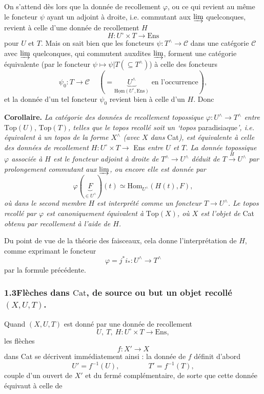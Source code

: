 \documentclass[11pt]{article}
\newcommand{\printedpage}[1]{\marginpar{\footnotesize p.~#1}}
\newcommand{\msp}[1]{\marginpar{\footnotesize [#1]}}
\newcommand{\uHom}{\underline{\mathrm{Hom}}}
\begin{document}
On s'attend dès lors que la donnée de recollement $\varphi$, ou ce qui revient au même le foncteur $\psi$ ayant un adjoint à droite, i.e. commutant aux $\varinjlim$ quelconques, revient à celle d'une donnée de recollement $H$
\[
H : U^\circ \times T \longrightarrow \mathrm{Ens}
\]
pour $U$ et $T$. Mais on sait bien que les foncteurs $\psi : T^\wedge \longrightarrow \mathcal{C}$ dans une catégorie $\mathcal{C}$ avec $\varinjlim$ quelconques, qui commutent auxdites $\varinjlim$, forment une catégorie équivalente (par le foncteur $\psi \longmapsto \psi|T(\subseteq T^\wedge)$) à celle des foncteurs
\[
\psi_0 : T \longrightarrow \mathcal{C} \quad\ (= \underbrace{U^\wedge}_{\uHom(U^\circ,\mathrm{Ens})} \text{ en l'occurrence}),
\]
\msp{page 64}
et la donnée d'un tel foncteur $\psi_0$ revient bien à celle d'un $H$. Donc

\textbf{Corollaire.} \textit{La catégorie des données de recollement topossique $\varphi : U^\wedge \longrightarrow T^\wedge$ entre} $\mathrm{Top}(U)$, $\mathrm{Top}(T)$\textit{, telles que le topos recollé soit un `topos} paradisiaque\textit{', i.e. équivalent à un topos de la forme $X^\wedge$ (avec $X$ dans} Cat\textit{), est équivalente à celle des données de recollement $H : U^\circ \times T \longrightarrow$} Ens \textit{entre $U$ et $T$. La donnée topossique $\varphi$ associée à $H$ est le foncteur adjoint à droite de $T^\wedge \longrightarrow U^\wedge$ déduit de $T \xrightarrow{H} U^\wedge$ par prolongement commutant aux $\varinjlim$, ou encore elle est donnée par}
\[
\varphi(\underbrace{F}_{\in U^\wedge})(t) \simeq \mathrm{Hom}_{U^\wedge}(H(t),F),
\]
\textit{où dans le second membre $H$ est interprété comme un foncteur $T \longrightarrow U^\wedge$. Le topos recollé par $\varphi$ est canoniquement équivalent à} $\mathrm{Top}(X)$\textit{, où $X$ est l'objet de} Cat \textit{obtenu par recollement à l'aide de $H$.}

Du point de vue de la théorie des faisceaux, cela donne l'interprétation de $H$, comme exprimant le foncteur
\[
\varphi = j^*i_* : U^\wedge \longrightarrow T^\wedge
\]
par la formule précédente.

\printedpage{47}

\msp{page 65}

\subsubsection*{1.3\quad Flèches dans $\mathrm{Cat}$, de source ou but un objet recollé $(X,U,T)$.}

Quand $(X,U,T)$ est donné par une donnée de recollement
\[
U,\ T,\ H : U^\circ \times T \longrightarrow \mathrm{Ens},
\]
les flèches
\[
f : X' \longrightarrow X
\]
dans Cat se décrivent immédiatement ainsi : la donnée de $f$ définit d'abord
\[
U' = f^{-1}(U), \qquad\qquad T' = f^{-1}(T),
\]
couple d'un ouvert de $X'$ et du fermé complémentaire, de sorte que cette donnée équivaut à celle de
\end{document}
